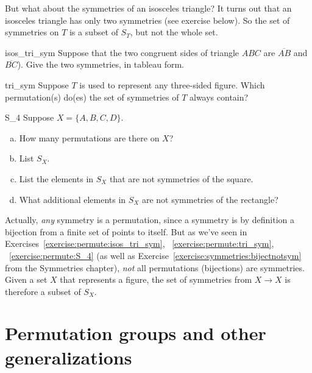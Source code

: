 But what about the symmetries of an isosceles triangle? It turns out that an isosceles triangle has only two symmetries (see exercise below). 
So  the set of symmetries on $T$ is a subset of $S_T$, but not the whole set.

\begin{exercise}{isos_tri_sym}
Suppose that the two congruent sides of triangle $ABC$ are $\overline{AB}$ and $\overline{BC}$). Give the two symmetries, in tableau form.
\end{exercise}

\begin{exercise}{tri_sym}
Suppose $T$ is used to represent any three-sided figure.  
Which permutation(s) do(es) the set of symmetries of $T$ always contain?
\end{exercise}

\begin{exercise}{S_4}
Suppose $X = \{A, B, C, D\}$.
\begin{enumerate}[(a)]
\item
How many permutations are there on $X$?
\item
List $S_X$.
\item
List the elements in $S_X$ that are not symmetries of the square.
\item
What additional elements in $S_X$ are not symmetries of the rectangle?
\end{enumerate}
\end{exercise}

Actually, \emph{any} symmetry is a permutation, since a symmetry is by definition a bijection from a finite set of points to itself.  But as we've seen in Exercises~\ref{exercise:permute:isos_tri_sym}, ~\ref{exercise:permute:tri_sym}, ~\ref{exercise:permute:S_4} (as well as Exercise~\ref{exercise:symmetries:bijectnotsym} from the Symmetries chapter), \emph{not} all permutations (bijections) are symmetries.  Given a set $X$ that represents a figure, the set of symmetries from $X \to X$ is therefore a subset of $S_X$.



\section{Permutation groups and other generalizations}
\label{sec:Permutation:GroupGeneralizations}

